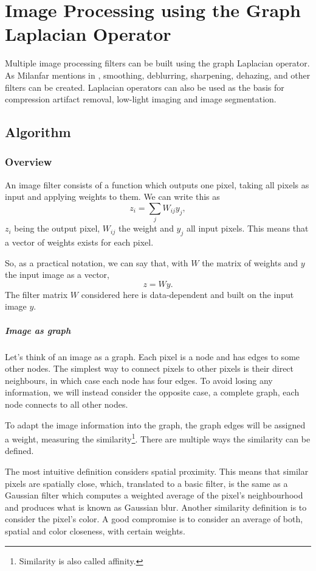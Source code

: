 \chapter{Image Processing using the Graph Laplacian Operator}

Multiple image processing filters can be built using the graph Laplacian operator.
As Milanfar mentions in \cite{siam_slides_2016}, smoothing, deblurring, sharpening, dehazing, and other filters can be created.
Laplacian operators can also be used as the basis for compression artifact removal, low-light imaging and image segmentation.

\section{Algorithm}

\subsection{Overview}

An image filter consists of a function which outputs one pixel, taking all pixels as input and applying weights to them. We can write this as
\[z_i = \sum_j W_{ij}y_j,\]
\(z_i\) being the output pixel, \(W_{ij}\) the weight and \(y_j\) all input pixels.
This means that a vector of weights exists for each pixel.

So, as a practical notation, we can say that, with \(W\) the matrix of weights and \(y\) the input image as a vector,
\[z = Wy.\]
The filter matrix \(W\) considered here is data-dependent and built on the input image \(y\).

\paragraph{Image as graph}
Let's think of an image as a graph.
Each pixel is a node and has edges to some other nodes.
The simplest way to connect pixels to other pixels is their direct neighbours, in which case each node has four edges.
To avoid losing any information, we will instead consider the opposite case, a complete graph, each node connects to all other nodes.

To adapt the image information into the graph, the graph edges will be assigned a weight, measuring the similarity\footnote{Similarity is also called affinity.}.
There are multiple ways the similarity can be defined.

The most intuitive definition considers spatial proximity.
This means that similar pixels are spatially close, which, translated to a basic filter, is the same as a Gaussian filter which computes a weighted average of the pixel's neighbourhood and produces what is known as Gaussian blur.
Another similarity definition is to consider the pixel's color.
A good compromise is to consider an average of both, spatial and color closeness, with certain weights.


